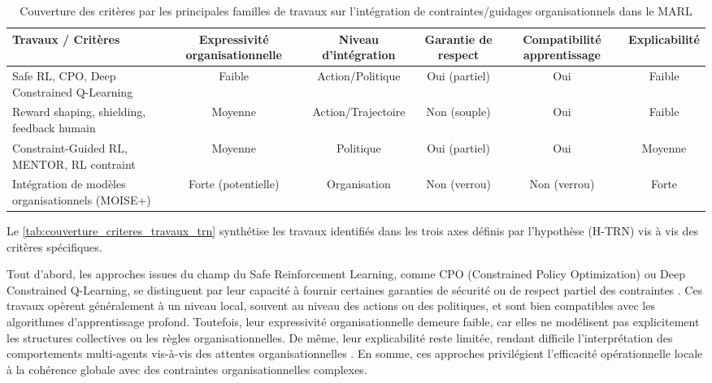 \begin{table}[h!]
  \centering
  \caption{Couverture des critères par les principales familles de travaux sur l’intégration de contraintes/guidages organisationnels dans le MARL}
  \label{tab:couverture_criteres_travaux_trn}
  \begin{tabular}{|p{5cm}|c|c|c|c|c|}
    \hline
    \textbf{Travaux / Critères}                      & \textbf{Expressivité organisationnelle} & \textbf{Niveau d’intégration} & \textbf{Garantie de respect} & \textbf{Compatibilité apprentissage} & \textbf{Explicabilité} \\
    \hline
    Safe RL, CPO, Deep Constrained Q-Learning        & Faible                                  & Action/Politique              & Oui (partiel)                & Oui                                  & Faible                 \\
    \hline
    Reward shaping, shielding, feedback humain       & Moyenne                                 & Action/Trajectoire            & Non (souple)                 & Oui                                  & Faible                 \\
    \hline
    Constraint-Guided RL, MENTOR, RL contraint       & Moyenne                                 & Politique                     & Oui (partiel)                & Oui                                  & Moyenne                \\
    \hline
    Intégration de modèles organisationnels (MOISE+) & Forte (potentielle)                     & Organisation                  & Non (verrou)                 & Non (verrou)                         & Forte                  \\
    \hline
  \end{tabular}
\end{table}

Le \autoref{tab:couverture_criteres_travaux_trn} synthétise les travaux identifiés dans les trois axes définis par l’hypothèse (H-TRN) vis à vis des critères spécifiques.

Tout d'abord, les approches issues du champ du Safe Reinforcement Learning, comme CPO (Constrained Policy Optimization) ou Deep Constrained Q-Learning, se distinguent par leur capacité à fournir certaines garanties de sécurité ou de respect partiel des contraintes \cite{achiam2017constrained}. Ces travaux opèrent généralement à un niveau local, souvent au niveau des actions ou des politiques, et sont bien compatibles avec les algorithmes d’apprentissage profond. Toutefois, leur expressivité organisationnelle demeure faible, car elles ne modélisent pas explicitement les structures collectives ou les règles organisationnelles. De même, leur explicabilité reste limitée, rendant difficile l'interprétation des comportements multi-agents vis-à-vis des attentes organisationnelles \cite{garcia2015comprehensive}. En somme, ces approches privilégient l'efficacité opérationnelle locale à la cohérence globale avec des contraintes organisationnelles complexes.

